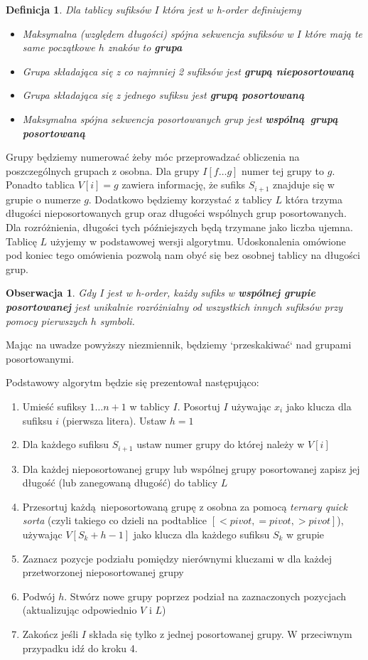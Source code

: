 \documentclass[12pt]{article}
\newtheorem*{observation}{Obserwacja}
\newtheorem*{definition}{Definicja}
\begin{document}
\begin{definition}
Dla tablicy sufiksów $I$ która jest w \textit{h-order} definiujemy
\begin{itemize}
    \item Maksymalna (względem długości) spójna sekwencja sufiksów w $I$ które mają te same początkowe $h$ znaków to \textbf{grupa}
    \item Grupa składająca się z co najmniej 2 sufiksów jest \textbf{grupą nieposortowaną}
    \item Grupa składająca się z jednego sufiksu jest \textbf{grupą posortowaną}
    \item Maksymalna spójna sekwencja posortowanych grup jest \textbf{wspólną grupą posortowaną}
\end{itemize}
\end{definition}
Grupy będziemy numerować żeby móc przeprowadzać obliczenia na poszczególnych grupach z osobna. Dla grupy $I[f \ldots g]$ numer tej grupy to $g$. Ponadto tablica $V[i] = g$ zawiera informację, że sufiks $S_{i+1}$ znajduje się w grupie o numerze $g$. Dodatkowo będziemy korzystać z tablicy $L$ która trzyma długości nieposortowanych grup oraz długości wspólnych grup posortowanych. Dla rozróżnienia, długości tych późniejszych będą trzymane jako liczba ujemna. Tablicę $L$ użyjemy w podstawowej wersji algorytmu. Udoskonalenia omówione pod koniec tego omówienia pozwolą nam obyć się bez osobnej tablicy na długości grup.
\begin{observation}
Gdy I jest w \textit{h-order}, każdy sufiks w \textbf{wspólnej grupie posortowanej} jest unikalnie rozróżnialny od wszystkich innych sufiksów przy pomocy pierwszych $h$ symboli.
\end{observation}
Mając na uwadze powyższy niezmiennik, będziemy `przeskakiwać` nad grupami posortowanymi.

Podstawowy algorytm będzie się prezentował następująco:
\begin{enumerate}
    \item Umieść sufiksy $1 \ldots n+1$ w tablicy $I$. Posortuj $I$ używając $x_i$ jako klucza dla sufiksu $i$ (pierwsza litera). Ustaw $h=1$
    \item Dla każdego sufiksu $S_{i+1}$ ustaw numer grupy do której należy w $V[i]$
    \item Dla każdej nieposortowanej grupy lub wspólnej grupy posortowanej zapisz jej długość (lub zanegowaną długość) do tablicy $L$
    \item Przesortuj każdą nieposortowaną grupę z osobna za pomocą \textit{ternary quick sorta} (czyli takiego co dzieli na podtablice $[< \textit{pivot}, = \textit{pivot}, > \textit{pivot}]$), używając $V[S_k + h - 1]$ jako klucza dla każdego sufiksu $S_k$ w grupie
    \item Zaznacz pozycje podziału pomiędzy nierównymi kluczami w dla każdej przetworzonej nieposortowanej grupy
    \item Podwój $h$. Stwórz nowe grupy poprzez podział na zaznaczonych pozycjach (aktualizując odpowiednio $V$ i $L$)
    \item Zakończ jeśli $I$ składa się tylko z jednej posortowanej grupy. W przeciwnym przypadku idź do kroku 4.
\end{enumerate}
\end{document}
